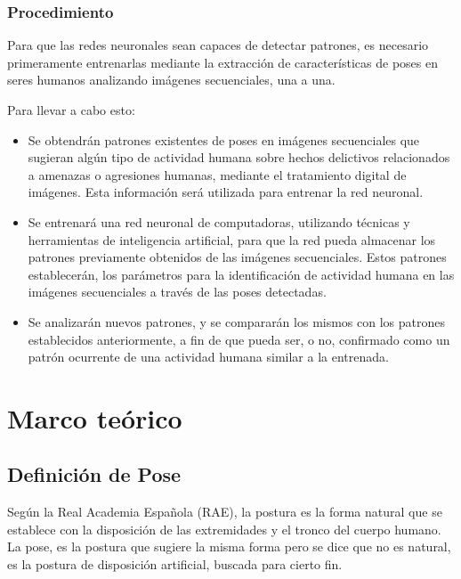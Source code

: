 \documentclass[a4paper,12pt,oneside,spanish]{book}
\begin{document}
\subsection{Procedimiento}
Para que las redes neuronales sean capaces de detectar patrones, es necesario primeramente entrenarlas mediante la extracción de características de poses en seres humanos analizando imágenes secuenciales, una a una. \par

Para llevar a cabo esto:
\begin{itemize}
	\setlength\itemsep{0.2em}
	\item Se obtendrán patrones existentes de poses en imágenes secuenciales que sugieran algún tipo de actividad humana sobre hechos delictivos relacionados a amenazas o agresiones humanas, mediante el tratamiento digital de imágenes. Esta información será utilizada para entrenar la red neuronal.\par
	\item Se entrenará una red neuronal de computadoras, utilizando técnicas y herramientas de inteligencia artificial, para que la red pueda almacenar los patrones previamente obtenidos de las imágenes secuenciales. Estos patrones establecerán, los parámetros para la identificación de actividad humana en las imágenes secuenciales a través de las poses detectadas.\par	
	\item Se analizarán nuevos patrones, y se compararán los mismos con los patrones establecidos anteriormente, a fin de que pueda ser, o no, confirmado como un patrón ocurrente de una actividad humana similar a la entrenada.\par	
\end{itemize}


\newpage
\chapter{Marco teórico}
\section{Definición  de Pose} \label{posturaypose}

Según la Real Academia Española (RAE), la postura es la forma natural que se establece con la disposición de las extremidades y el tronco del cuerpo humano. La pose, es la postura que sugiere la misma forma pero se dice que no es natural, es la postura de disposición artificial, buscada para cierto fin. \par
\end{document}
